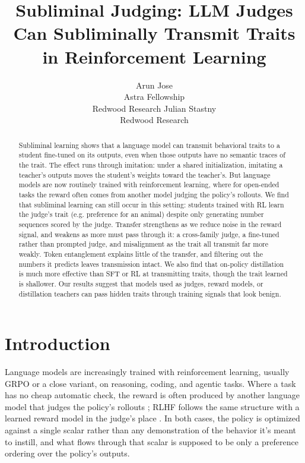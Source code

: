 \documentclass{article}
\title{Subliminal Judging: LLM Judges Can Subliminally Transmit Traits in Reinforcement Learning}
\author{%
  Arun Jose \\
  Astra Fellowship \\
  Redwood Research
  \And
  Julian Stastny \\
  Redwood Research
}
\begin{document}
\maketitle

\begin{abstract}
Subliminal learning shows that a language model can transmit behavioral traits to a student fine-tuned on its outputs, even when those outputs have no semantic traces of the trait. The effect runs through imitation: under a shared initialization, imitating a teacher's outputs moves the student's weights toward the teacher's. But language models are now routinely trained with reinforcement learning, where for open-ended tasks the reward often comes from another model judging the policy's rollouts. We find that subliminal learning can still occur in this setting: students trained with RL learn the judge's trait (e.g. preference for an animal) despite only generating number sequences scored by the judge. Transfer strengthens as we reduce noise in the reward signal, and weakens as more must pass through it: a cross-family judge, a fine-tuned rather than prompted judge, and misalignment as the trait all transmit far more weakly. Token entanglement explains little of the transfer, and filtering out the numbers it predicts leaves transmission intact. We also find that on-policy distillation is much more effective than SFT or RL at transmitting traits, though the trait learned is shallower. Our results suggest that models used as judges, reward models, or distillation teachers can pass hidden traits through training signals that look benign.
\end{abstract}

\section{Introduction}
Language models are increasingly trained with reinforcement learning, usually GRPO \citep{shao2024grpo} or a close variant, on reasoning, coding, and agentic tasks. Where a task has no cheap automatic check, the reward is often produced by another language model that judges the policy's rollouts \citep{zheng2023llmjudge}; RLHF follows the same structure with a learned reward model in the judge's place \citep{christiano2017deep, ouyang2022training}. In both cases, the policy is optimized against a single scalar rather than any demonstration of the behavior it's meant to instill, and what flows through that scalar is supposed to be only a preference ordering over the policy's outputs.
\end{document}

